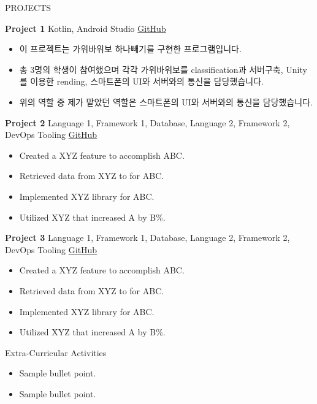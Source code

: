 \documentclass{resume} %
\begin{document}
\begin{rSection}{PROJECTS}
\vspace{-1.25em}
\item \textbf{Project 1} {Kotlin, Android Studio} \hfill \href{www.github.com/GITHUBURL}{GitHub}
\begin{itemize}
    \itemsep -3pt {} 
     \item 이 프로젝트는 가위바위보 하나빼기를 구현한 프로그램입니다. 
     \item 총 3명의 학생이 참여했으며 각각 가위바위보를 classification과 서버구축, Unity를 이용한 rending, 스마트폰의 UI와 서버와의 통신을 담당했습니다.
    \item 위의 역할 중 제가 맡았던 역할은 스마트폰의 UI와 서버와의 통신을 담당했습니다.
 \end{itemize}
\item \textbf{Project 2} {Language 1, Framework 1, Database, Language 2, Framework 2, DevOps Tooling} \hfill \href{www.github.com/GITHUBURL}{GitHub}
\begin{itemize}
    \itemsep -3pt {} 
     \item Created a XYZ feature to accomplish ABC.
     \item Retrieved data from XYZ to for ABC.
    \item Implemented XYZ library for ABC.
    \item Utilized XYZ that increased A by B\%.
 \end{itemize}
\item \textbf{Project 3} {Language 1, Framework 1, Database, Language 2, Framework 2, DevOps Tooling} \hfill \href{www.github.com/GITHUBURL}{GitHub}
\begin{itemize}
    \itemsep -3pt {} 
     \item Created a XYZ feature to accomplish ABC.
     \item Retrieved data from XYZ to for ABC.
    \item Implemented XYZ library for ABC.
    \item Utilized XYZ that increased A by B\%.
 \end{itemize}
\end{rSection} 

\begin{rSection}{Extra-Curricular Activities} 
\begin{itemize}
    \item 	Sample bullet point.
    \item	Sample bullet point.
\end{itemize}


\end{rSection}
\end{document}
